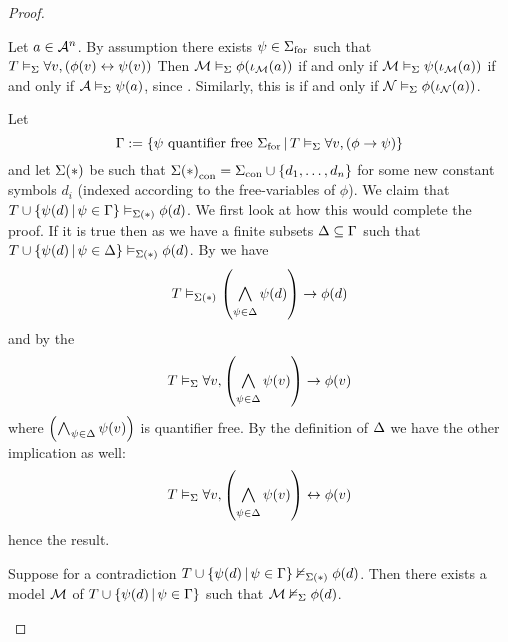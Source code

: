 \begin{proof}
    \begin{forward}
        Let $a \in \AA^n$.
        By assumption there exists $\psi \in \form{\Si}$ such that 
        $T \model{\Si} \forall v, \brkt{\phi(v) \IFF \psi(v)}$
        Then $\MM \model{\Si} \phi(\io_\MM(a))$ if and only if 
        $\MM \model{\Si} \psi(\io_\MM(a))$ if and only if 
        $\AA \model{\Si} \psi(a)$, 
        since .
        Similarly, this is if and only if $\NN \model{\Si} \phi(\io_\NN(a))$.
    \end{forward}

    \begin{backward}
        Let 
        \[
            \Ga := \set{\psi \text{ quantifier free } \form{\Si} \st
            T \model{\Si} \forall v, (\phi \to \psi)}
        \]
        and let $\Si(*)$ be such that 
        $\const{\Si(*)} = \const{\Si} \cup \set{d_1,\dots,d_n}$
        for some new constant symbols $d_i$ 
        (indexed according to the free-variables of $\phi$).
        We claim that 
        $T \cup \set{\psi(d) \st \psi \in \Ga} \model{\Si(*)} \phi(d)$.
        We first look at how this would complete the proof.
        If it is true then as 
        we have a finite subsets $\De \subs \Ga$ such that
        $T \cup \set{\psi(d) \st \psi \in \De} \model{\Si(*)} \phi(d)$.
        By  we have
        \[T \model{\Si(*)} \brkt{\bigand{\psi \in \De}{} \psi(d)} \to \phi(d)\]
        and by the 
        \[
            T \model{\Si} \forall v, 
            \brkt{\bigand{\psi \in \De}{} \psi(v)} \to \phi(v) 
        \]
        where $\brkt{\bigand{\psi \in \De}{} \psi(v)}$ is quantifier free.
        By the definition of $\De$ we have the other implication as well:
        \[
            T \model{\Si} \forall v, 
            \brkt{\bigand{\psi \in \De}{} \psi(v)} \IFF \phi(v) 
        \]
        hence the result.

        Suppose for a contradiction 
        $T \cup \set{\psi(d) \st \psi \in \Ga} \nodel{\Si(*)} \phi(d)$.
        Then there exists a model
        $\MM$ of $T \cup \set{\psi(d) \st \psi \in \Ga}$ such that 
        $\MM \nodel{\Si} \phi(d)$.


\end{backward}
\end{proof}
